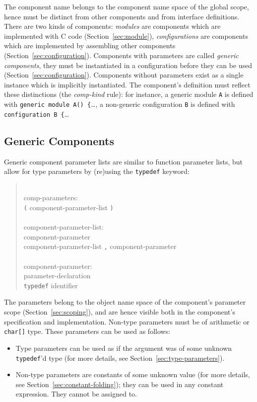 \documentclass[11pt,letterpaper]{article}
\newcommand{\kw}[1]{{\tt #1}}
\newcommand{\code}[1]{{\tt #1}}
\newcommand{\grammarshift}{\vspace*{-.7cm}}
\newcommand{\grammarindent}{\hspace*{2cm}\= \\ \kill}
\begin{document}
The component name belongs to the component name space of the global scope,
hence must be distinct from other components and from interface
definitions. There are two kinds of components: \emph{modules} are
components which are implemented with C code (Section~\ref{sec:module}),
\emph{configurations} are components which are implemented by assembling
other components (Section~\ref{sec:configuration}). Components with
parameters are called \emph{generic components}, they must be instantiated
in a configuration before they can be used
(Section~\ref{sec:configuration}). Components without parameters exist as a
single instance which is implicitly instantiated. The component's
definition must reflect these distinctions (the \emph{comp-kind} rule): for
instance, a generic module \code{A} is defined with \code{generic module
A() \{}\ldots, a non-generic configuration \code{B} is defined with
\code{configuration B \{}\ldots

\subsection{Generic Components}
\label{sec:generic-components}

Generic component parameter lists are similar to function parameter lists,
but allow for type parameters by (re)using the \kw{typedef} keyword:
\begin{quote} \grammarshift \em \begin{tabbing}
\grammarindent
comp-parameters:\\
\>	\kw{(} component-parameter-list \kw{)}\\
\\
component-parameter-list:\\
\>	component-parameter\\
\>	component-parameter-list \kw{,} component-parameter\\
\\
component-parameter:\\
\>	parameter-declaration\\
\>	\kw{typedef} identifier
\end{tabbing} \end{quote}
The parameters belong to the object name space of the component's parameter
scope (Section~\ref{sec:scoping}), and are hence visible both in the
component's specification and implementation. Non-type parameters must be
of arithmetic or \code{char[]} type. These parameters can be used as
follows:
\begin{itemize}
\item Type parameters can be used as if the argument was of some unknown
\kw{typedef}'d type (for more details, see Section~\ref{sec:type-parameters}).
\item Non-type parameters are constants of some unknown value (for more
details, see Section~\ref{sec:constant-folding}); they can be used in any
constant expression. They cannot be assigned to.
\end{itemize}
\end{document}
